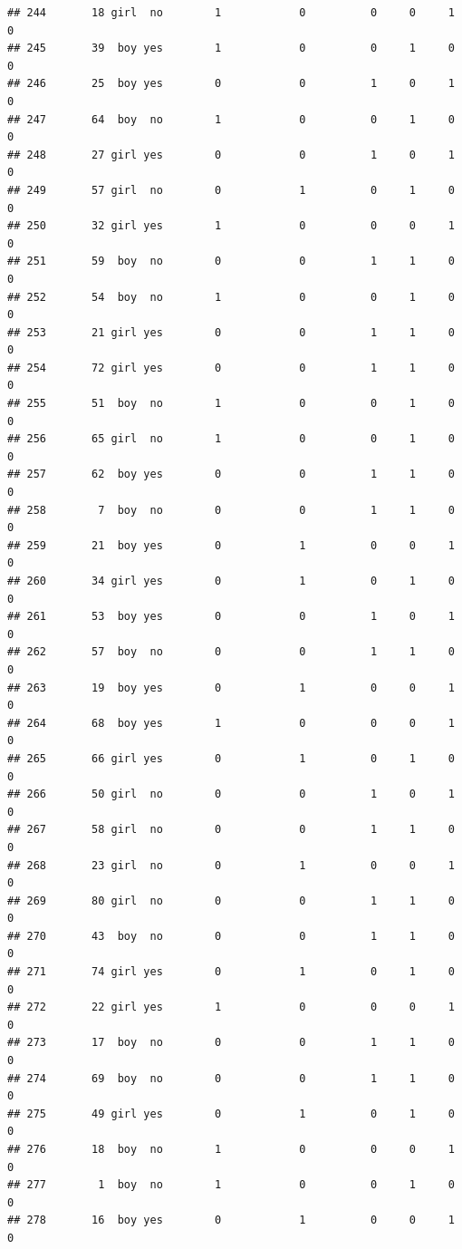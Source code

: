 \documentclass[man]{apa6}
\begin{document}
\begin{verbatim}
## 244       18 girl  no        1            0          0     0     1     0
## 245       39  boy yes        1            0          0     1     0     0
## 246       25  boy yes        0            0          1     0     1     0
## 247       64  boy  no        1            0          0     1     0     0
## 248       27 girl yes        0            0          1     0     1     0
## 249       57 girl  no        0            1          0     1     0     0
## 250       32 girl yes        1            0          0     0     1     0
## 251       59  boy  no        0            0          1     1     0     0
## 252       54  boy  no        1            0          0     1     0     0
## 253       21 girl yes        0            0          1     1     0     0
## 254       72 girl yes        0            0          1     1     0     0
## 255       51  boy  no        1            0          0     1     0     0
## 256       65 girl  no        1            0          0     1     0     0
## 257       62  boy yes        0            0          1     1     0     0
## 258        7  boy  no        0            0          1     1     0     0
## 259       21  boy yes        0            1          0     0     1     0
## 260       34 girl yes        0            1          0     1     0     0
## 261       53  boy yes        0            0          1     0     1     0
## 262       57  boy  no        0            0          1     1     0     0
## 263       19  boy yes        0            1          0     0     1     0
## 264       68  boy yes        1            0          0     0     1     0
## 265       66 girl yes        0            1          0     1     0     0
## 266       50 girl  no        0            0          1     0     1     0
## 267       58 girl  no        0            0          1     1     0     0
## 268       23 girl  no        0            1          0     0     1     0
## 269       80 girl  no        0            0          1     1     0     0
## 270       43  boy  no        0            0          1     1     0     0
## 271       74 girl yes        0            1          0     1     0     0
## 272       22 girl yes        1            0          0     0     1     0
## 273       17  boy  no        0            0          1     1     0     0
## 274       69  boy  no        0            0          1     1     0     0
## 275       49 girl yes        0            1          0     1     0     0
## 276       18  boy  no        1            0          0     0     1     0
## 277        1  boy  no        1            0          0     1     0     0
## 278       16  boy yes        0            1          0     0     1     0

\end{verbatim}
\end{document}
